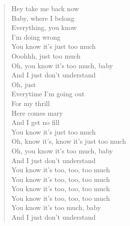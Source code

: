 \begin{verse}
Hey take me back now\\
Baby, where I belong\\
Everything, you know\\
I'm doing wrong\\
You know it's just too much\\
Ooohhh, just too much\\
Oh, you know it's too much, baby\\
And I just don't understand\\
Oh, just\\

Everytime I'm going out\\
For my thrill\\
Here comes mary\\
And I get no fill\\
You know it's just too much\\
Oh, know it's, know it's just too much\\
Oh, you know it's too much, baby\\
And I just don't understand\\

You know it's too, too, too much\\
You know it's too, too, too much\\
You know it's too, too, too much\\
You know it's too, too, too much\\
You know it's too much, baby\\
And I just don't understand\\
\end{verse}

